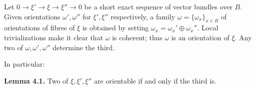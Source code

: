 Let $0 \rightarrow \xi' \rightarrow \xi \rightarrow \xi'' \rightarrow 0$ be a short exact sequence of vector bundles over $B$. Given orientations $\omega', \omega''$ for $\xi', \xi''$ respectively, a family $\omega = \{\omega_x\}_{x \in B}$ of orientations of fibres of $\xi$ is obtained by setting $\omega_x = \omega_x' \oplus \omega_x''$. Local trivializations make it clear that $\omega$ is coherent; thus $\omega$ is an orientation of $\xi$. Any two of $\omega, \omega', \omega''$ determine the third.

In particular:

\textbf{Lemma 4.1.} Two of $\xi, \xi', \xi''$ are orientable if and only if the third is.
